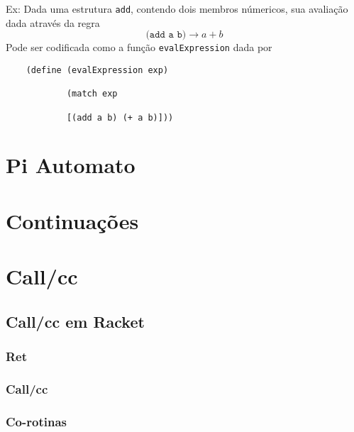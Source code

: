 Ex:
    Dada uma estrutura \texttt{add}, contendo dois membros númericos, sua avaliação dada através da regra
    $$(\texttt{add a b)} \xrightarrow{} a+b  $$
    Pode ser codificada como a função \texttt{evalExpression} dada por
    
    \begin{verbatim}
    (define (evalExpression exp)
    
            (match exp
            
            [(add a b) (+ a b)]))
    \end{verbatim}
    
\section{Pi Automato}

\section{Continuações}

\section{Call/cc}
\subsection{Call/cc em Racket}
\subsubsection{Ret}
\subsubsection{Call/cc}
\subsubsection{Co-rotinas}